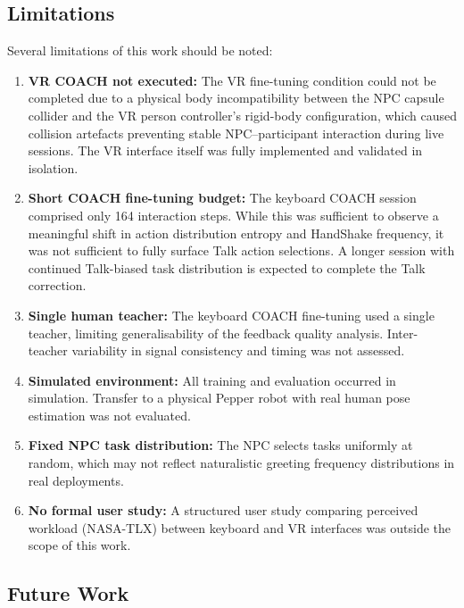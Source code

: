 \documentclass[../report.tex]{subfiles}
\begin{document}
    \subsection{Limitations}

    Several limitations of this work should be noted:

    \begin{enumerate}
        \item \textbf{VR COACH not executed:} The VR fine-tuning condition could not be completed due to a physical body incompatibility between the NPC capsule collider and the VR person controller's rigid-body configuration, which caused collision artefacts preventing stable NPC--participant interaction during live sessions. The VR interface itself was fully implemented and validated in isolation.

        \item \textbf{Short COACH fine-tuning budget:} The keyboard COACH session comprised only 164 interaction steps. While this was sufficient to observe a meaningful shift in action distribution entropy and HandShake frequency, it was not sufficient to fully surface Talk action selections. A longer session with continued Talk-biased task distribution is expected to complete the Talk correction.

        \item \textbf{Single human teacher:} The keyboard COACH fine-tuning used a single teacher, limiting generalisability of the feedback quality analysis. Inter-teacher variability in signal consistency and timing was not assessed.

        \item \textbf{Simulated environment:} All training and evaluation occurred in simulation. Transfer to a physical Pepper robot with real human pose estimation was not evaluated.

        \item \textbf{Fixed NPC task distribution:} The NPC selects tasks uniformly at random, which may not reflect naturalistic greeting frequency distributions in real deployments.

        \item \textbf{No formal user study:} A structured user study comparing perceived workload (NASA-TLX) between keyboard and VR interfaces was outside the scope of this work.
    \end{enumerate}

    \subsection{Future Work}
    \label{sec:conclusions:future_work}
\end{document}
